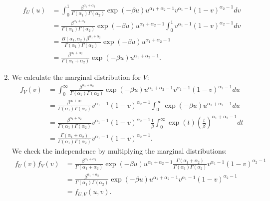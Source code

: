 \begin{solution}
\begin{enumerate}[label = (\alph*)]
\begin{align*}
      f_U(u) &= \int_0^1 \frac{\beta^{\alpha_1 + \alpha_2}}{\Gamma(\alpha_1)\Gamma(\alpha_2)}
      \exp(-\beta u)u^{\alpha_1 + \alpha_2 - 1}v^{\alpha_1 - 1}(1-v)^{\alpha_2 - 1} dv \\
      &= \frac{\beta^{\alpha_1 + \alpha_2}}{\Gamma(\alpha_1)\Gamma(\alpha_2)}
      \exp(-\beta u)u^{\alpha_1 + \alpha_2 - 1}\int_0^1 v^{\alpha_1 - 1}(1-v)^{\alpha_2 - 1} dv \\
      &= \frac{B(\alpha_1, \alpha_2)\beta^{\alpha_1 + \alpha_2}}{\Gamma(\alpha_1)\Gamma(\alpha_2)}
      \exp(-\beta u)u^{\alpha_1 + \alpha_2 - 1} \\
      &= \frac{\beta^{\alpha_1 + \alpha_2}}{\Gamma(\alpha_1 + \alpha_2)}
      \exp(-\beta u)u^{\alpha_1 + \alpha_2 - 1}.
    \end{align*}
    \item We calculate the marginal distribution for $V$:
    \begin{align*}
      f_V(v) &= \int_0^{\infty}\frac{\beta^{\alpha_1 + \alpha_2}}{\Gamma(\alpha_1)\Gamma(\alpha_2)}
      \exp(-\beta u)u^{\alpha_1 + \alpha_2 - 1}v^{\alpha_1 - 1}(1-v)^{\alpha_2 - 1} du \\
      &= \frac{\beta^{\alpha_1 + \alpha_2}}{\Gamma(\alpha_1)\Gamma(\alpha_2)}v^{\alpha_1 - 1}(1-v)^{\alpha_2 - 1}
      \int_0^{\infty}\exp(-\beta u)u^{\alpha_1 + \alpha_2 - 1} du \\
      &= \frac{\beta^{\alpha_1 + \alpha_2}}{\Gamma(\alpha_1)\Gamma(\alpha_2)}v^{\alpha_1 - 1}(1-v)^{\alpha_2 - 1}
      \frac{1}{\beta}\int_0^{\infty}\exp(t)\left(\frac{t}{\beta}\right)^{\alpha_1 + \alpha_2 - 1} dt \\
      &= \frac{\Gamma(\alpha_1+\alpha_2)}{\Gamma(\alpha_1)\Gamma(\alpha_2)}v^{\alpha_1 - 1}(1-v)^{\alpha_2 - 1}.
    \end{align*}
    We check the independence by multiplying the marginal distributions:
    \begin{align*}
      f_U(v)f_V(v) &= \frac{\beta^{\alpha_1 + \alpha_2}}{\Gamma(\alpha_1 + \alpha_2)}
      \exp(-\beta u)u^{\alpha_1 + \alpha_2 - 1}\frac{\Gamma(\alpha_1+\alpha_2)}{\Gamma(\alpha_1)\Gamma(\alpha_2)}
      v^{\alpha_1 - 1}(1-v)^{\alpha_2 - 1} \\
      &= \frac{\beta^{\alpha_1 + \alpha_2}}{\Gamma(\alpha_1)\Gamma(\alpha_2)}
      \exp(-\beta u)u^{\alpha_1 + \alpha_2 - 1}v^{\alpha_1 - 1}(1-v)^{\alpha_2 - 1} \\
      &= f_{U,V}(u,v).
    \end{align*}
\end{enumerate}

\end{solution}

